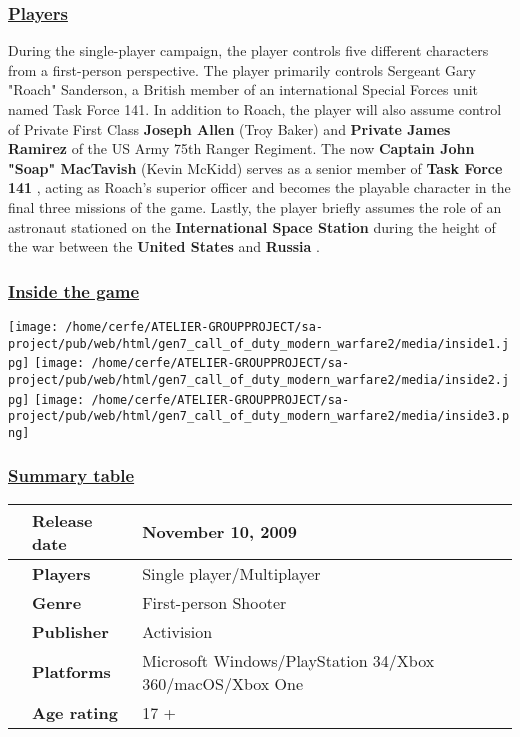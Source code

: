 \documentclass[a4paper,10pt]{book}
\begin{document}
 \subsubsection{\underline{Players }}
 
        During the single-player campaign, the player controls five different characters from a first-person perspective.
        The player primarily controls Sergeant Gary "Roach" Sanderson, a British member of an international Special Forces unit named Task Force 141.
        In addition to Roach, the player will also assume control of Private First Class  \textbf{Joseph Allen }  (Troy Baker) and  \textbf{Private James Ramirez }  of the US Army 75th Ranger Regiment. 
        The now  \textbf{Captain John "Soap" MacTavish }  (Kevin McKidd) serves as a senior member of  \textbf{Task Force 141 } , acting as Roach's superior officer and becomes the playable character in the final three missions of the game. 
        Lastly, the player briefly assumes the role of an astronaut stationed on the  \textbf{International Space Station }  during the height of the war between the  \textbf{United States }  and  \textbf{Russia } .
         
 \subsubsection{\underline{Inside the game }}
 \texttt{[image: /home/cerfe/ATELIER-GROUPPROJECT/sa-project/pub/web/html/gen7\_call\_of\_duty\_modern\_warfare2/media/inside1.jpg]}
 \texttt{[image: /home/cerfe/ATELIER-GROUPPROJECT/sa-project/pub/web/html/gen7\_call\_of\_duty\_modern\_warfare2/media/inside2.jpg]}
 \texttt{[image: /home/cerfe/ATELIER-GROUPPROJECT/sa-project/pub/web/html/gen7\_call\_of\_duty\_modern\_warfare2/media/inside3.png]}
 \subsubsection{\underline{Summary table }}
 \begin{longtable}{p{1mm}|l|l|}\hline
 
 & \textbf{Release date } 
 & November 10, 2009 
 \\\hline
 
 & \textbf{Players } 
 & Single player/Multiplayer 
 \\\hline
 
 & \textbf{Genre } 
 & First-person Shooter 
 \\\hline
 
 & \textbf{Publisher } 
 & Activision 
 \\\hline
 
 & \textbf{Platforms } 
 & Microsoft Windows/PlayStation 34/Xbox 360/macOS/Xbox One 
 \\\hline
 
 & \textbf{Age rating } 
 & 17 + 
 \\\hline
 \end{longtable}
 
\end{document}
